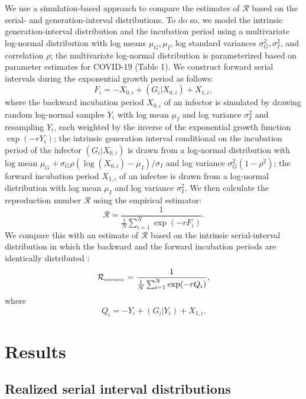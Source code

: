 \documentclass[12pt]{article}
\newcommand{\RR}{\ensuremath{{\mathcal R}}\xspace}
\newcommand{\Rintrinsic}{\ensuremath{{\mathcal R}_{\textrm{\tiny intrinsic}}}\xspace}
\begin{document}
We use a simulation-based approach to compare the estimates of \RR based on the serial- and generation-interval distributions. 
To do so, we model the intrinsic generation-interval distribution and the incubation period using a multivariate log-normal distribution with log means $\mu_G, \mu_I$, log standard variances $\sigma_G^2, \sigma_I^2$, and correlation $\rho$;
the multivariate log-normal distribution is parameterized based on parameter estimates for COVID-19 (Table 1).
We construct forward serial intervals during the exponential growth period as follows:
\begin{equation}
F_i = -X_{0,i} + (G_i|X_{0,i}) + X_{1,i},
\end{equation}
where the backward incubation period $X_{0,i}$ of an infector is simulated by drawing random log-normal samples $Y_i$ with log mean $\mu_I$ and log variance $\sigma_I^2$ and resampling $Y_i$, each weighted by the inverse of the exponential growth function $\exp(-rY_i)$;
the intrinsic generation interval conditional on the incubation period of the infector $(G_i|X_{0,i})$ is drawn from a log-normal distribution with log mean $\mu_G + \sigma_G \rho (\log(X_{0,i}) - \mu_I)/\sigma_I$ and log variance $\sigma_G^2 (1-\rho^2)$;
the forward incubation period $X_{1,i}$ of an infectee is drawn from a log-normal distribution with log mean $\mu_I$ and log variance $\sigma_I^2$.
We then calculate the reproduction number \RR using the empirical estimator:
\begin{equation}
\RR = \frac{1}{\frac{1}{N}\sum_{i=1}^N \exp(- r F_i)}.
\end{equation}
We compare this with an estimate of \RR based on the intrinsic serial-interval distribution in which the backward and the forward incubation periods are identically distributed \citep{svensson2007note,klinkenberg2011correlation,champredon2018equivalence, britton2019estimation}:
\begin{equation}
  \Rintrinsic = \frac{1}{\frac{1}{N}\sum_{i=1}^N \exp(- r Q_i)},
\end{equation}
where
\begin{equation}
Q_i = -Y_i + (G_i|Y_i) + X_{1,i}.
\end{equation}

\section{Results}

\subsection{Realized serial interval distributions}
\end{document}
